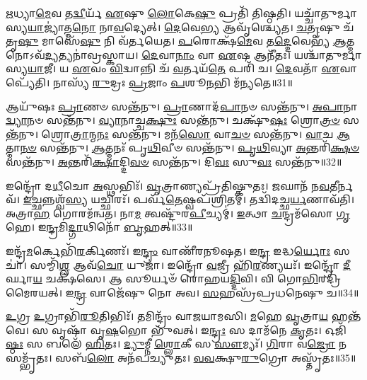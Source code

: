 \-\ul{𑌋}\-𑌧𑍍𑌯𑌾\-\ul{𑌮𑍇}\-𑌵 𑌤\-\ul{𑌦𑍍𑌵𑍀}\-𑌰𑍍𑌯᳴ \ul{𑌏}\-𑌷𑍁 \ul{𑌲𑍋}\-𑌕𑍇\-\ul{𑌷𑍁} 𑌪𑍍𑌰𑌤𑌿᳴ 𑌤𑌿𑌷𑍍𑌠𑌤𑌿।
𑌯𑌚𑍍𑌚𑌾᳴𑌤𑍁𑌰𑍍𑌮𑌾𑌸𑍍𑌯\-\-\ul{𑌯𑌾}\-𑌜𑍍𑌯𑌾॑𑌤𑍍𑌮\-\ul{𑌨𑍋} 𑌨𑌾\-\ul{𑌵}\-𑌦𑍍𑌯𑍇𑌤𑍍।
\-\ul{𑌦𑍇}\-𑌵𑍇\-\ul{𑌭𑍍𑌯} 𑌆𑌵𑍃᳴𑌶𑍍𑌚𑍍𑌯𑍇𑌤।
\-\ul{𑌚}\-\-\ul{𑌤𑍃}\-𑌷𑍁 𑌚᳴𑌤𑍃\-\ul{𑌷𑍁} 𑌮𑌾𑌸𑍇᳴\-\ul{𑌷𑍁} 𑌨𑌿 𑌵᳴𑌰𑍍𑌤𑌯𑍇𑌤।
\-\ul{𑌪}\-𑌰𑍋𑌕𑍍𑌷᳴\-\ul{𑌮𑍇}\-𑌵 𑌤\-\ul{𑌦𑍍𑌦𑍇}\-𑌵𑍇𑌭𑍍𑌯᳴ \ul{𑌆}\-𑌤𑍍𑌮𑌨𑍋\-𑌽𑌵᳴\-\ul{𑌦𑍍𑌯}\-𑌤𑍍𑌯𑌨𑌾॑\-𑌵𑍍𑌰𑌸𑍍𑌕𑌾𑌯।
\-\ul{𑌦𑍇}\-𑌵𑌾\-\ul{𑌨𑌾𑌂} 𑌵𑌾 \ul{𑌏}\-𑌷 𑌆𑌨𑍀᳴𑌤𑌃।
𑌯𑌶𑍍𑌚𑌾᳴𑌤𑍁𑌰𑍍𑌮𑌾𑌸𑍍𑌯\-\ul{𑌯𑌾}\-𑌜𑍀।
𑌯 \ul{𑌏}\-𑌵𑌂 \ul{𑌵𑌿}\-𑌦𑍍𑌵𑌾𑌨𑍍𑌨𑌿 𑌚᳴ \ul{𑌵}\-𑌰𑍍𑌤𑌯᳴\-\ul{𑌤𑍇} 𑌪𑌰𑌿᳴ 𑌚।
\-\ul{𑌦𑍇}\-𑌵𑌤𑌾᳴ \ul{𑌏}\-𑌵𑌾𑌪𑍍𑌯𑍇᳴𑌤𑌿।
𑌨𑌾𑌸𑍍𑌯᳴ \ul{𑌰𑍁}\-𑌦𑍍𑌰𑌃 \ul{𑌪𑍍𑌰}\-𑌜𑌾𑌂 \ul{𑌪}\-𑌶𑍂\-\ul{𑌨}\-𑌭𑌿 𑌮᳴𑌨𑍍𑌯𑌤𑍇॥31॥\anuvakamend[\-\ul{𑌏}\-\-\ul{𑌤𑍍𑌯𑍇}\-\-\ul{𑌤𑍍𑌯}\-\-\ul{𑌯𑍁}\-\-\ul{𑌞𑍍𑌜}\-𑌤𑌾𑌸𑍁᳴𑌰𑌾 𑌏𑌤𑌿 \ul{𑌲𑍋}\-𑌕𑌾 𑌮᳴𑌨𑍍𑌯𑌤𑍇]

𑌆𑌯𑍁᳴𑌷𑌃 \ul{𑌪𑍍𑌰𑌾}\-𑌣𑍞 𑌸𑌨𑍍𑌤᳴𑌨𑍁।
\-\ul{𑌪𑍍𑌰𑌾}\-𑌣𑌾𑌦᳴\-\ul{𑌪𑌾}\-𑌨𑍞 𑌸𑌨𑍍𑌤᳴𑌨𑍁।
\-\ul{𑌅}\-\-\ul{𑌪𑌾}\-𑌨𑌾\-\ul{𑌦𑍍𑌵𑍍𑌯𑌾}\-𑌨𑍞 𑌸𑌨𑍍𑌤᳴𑌨𑍁।
\-\ul{𑌵𑍍𑌯𑌾}\-𑌨𑌾𑌚𑍍𑌚\-\ul{𑌕𑍍𑌷𑍁𑌃} 𑌸𑌨𑍍𑌤᳴𑌨𑍁।
𑌚𑌕𑍍𑌷𑍁᳴\-\ul{𑌷𑌃} 𑌶𑍍𑌰𑍋\-\ul{𑌤𑍍𑌰}\-\-\ul{𑍞} 𑌸𑌨𑍍𑌤᳴𑌨𑍁।
𑌶𑍍𑌰𑍋\-\ul{𑌤𑍍𑌰𑌾}\-𑌨𑍍𑌮\-\ul{𑌨𑌃} 𑌸𑌨𑍍𑌤᳴𑌨𑍁।
𑌮𑌨᳴\-\ul{𑌸𑍋} 𑌵𑌾\-\ul{𑌚}\-\-\ul{𑍞} 𑌸𑌨𑍍𑌤᳴𑌨𑍁।
\-\ul{𑌵𑌾}\-𑌚 \ul{𑌆}\-𑌤𑍍𑌮𑌾\-\ul{𑌨}\-\-\ul{𑍞} 𑌸𑌨𑍍𑌤᳴𑌨𑍁।
\-\ul{𑌆}\-𑌤𑍍𑌮𑌨𑌃᳴ 𑌪𑍃\-\ul{𑌥𑌿}\-𑌵𑍀𑍞 𑌸𑌨𑍍𑌤᳴𑌨𑍁।
\-\ul{𑌪𑍃}\-\-\ul{𑌥𑌿}\-𑌵𑍍𑌯𑌾 \ul{𑌅}\-𑌨𑍍𑌤𑌰𑌿᳴\-\ul{𑌕𑍍𑌷}\-\-\ul{𑍞} 𑌸𑌨𑍍𑌤᳴𑌨𑍁।
\-\ul{𑌅}\-𑌨𑍍𑌤𑌰𑌿᳴\-\ul{𑌕𑍍𑌷𑌾}\-𑌦𑍍𑌦𑌿\-\ul{𑌵}\-\-\ul{𑍞} 𑌸𑌨𑍍𑌤᳴𑌨𑍁।
𑌦𑌿\-\ul{𑌵𑌃} 𑌸𑍁\-\ul{𑌵𑌃} 𑌸𑌨𑍍𑌤᳴𑌨𑍁॥32॥\anuvakamend[\-\ul{𑌅}\-𑌨𑍍𑌤𑌰𑌿᳴\-\ul{𑌕𑍍𑌷}\-\-\ul{𑍞} 𑌸𑌨𑍍𑌤᳴\-\ul{𑌨𑍁} 𑌦𑍍𑌵𑍇 𑌚᳴]

𑌇𑌨𑍍𑌦𑍍𑌰𑍋᳴ 𑌦\-\ul{𑌧𑍀}\-𑌚𑍋 \ul{𑌅}\-𑌸𑍍𑌥𑌭𑌿𑌃᳴।
\-\ul{𑌵𑍃}\-𑌤𑍍𑌰𑌾𑌣𑍍𑌯𑌪𑍍𑌰᳴𑌤𑌿𑌷𑍍𑌕𑍁𑌤𑌃।
\-\ul{𑌜}\-𑌘𑌾𑌨᳴ 𑌨\-\ul{𑌵}\-𑌤𑍀𑌰𑍍𑌨𑌵᳴।
\-\ul{𑌇}\-𑌚𑍍𑌛𑌨𑍍𑌨𑌶𑍍𑌵᳴\-\ul{𑌸𑍍𑌯} 𑌯𑌚𑍍𑌛𑌿𑌰𑌃᳴।
𑌪𑌰𑍍𑌵᳴\-\ul{𑌤𑍇}\-𑌷𑍍𑌵𑌪᳴𑌶𑍍𑌰𑌿𑌤𑌮𑍍।
𑌤𑌦𑍍𑌵𑌿᳴𑌦𑌚𑍍𑌛\-\ul{𑌰𑍍𑌯}\-𑌣𑌾𑌵᳴𑌤𑌿।
𑌅𑌤𑍍𑌰𑌾\-\ul{𑌹} 𑌗𑍋𑌰𑌮᳴𑌨𑍍𑌵𑌤।
𑌨𑌾\-\ul{𑌮} 𑌤𑍍𑌵𑌷𑍍𑌟𑍁᳴𑌰\-\ul{𑌪𑍀}\-𑌚𑍍𑌯𑌮𑍍॑।
\-\ul{𑌇}\-𑌤𑍍𑌥𑌾 \ul{𑌚}\-𑌨𑍍𑌦𑍍𑌰𑌮᳴𑌸𑍋 \ul{𑌗𑍃}\-𑌹𑍇।
𑌇\-\ul{𑌨𑍍𑌦𑍍𑌰}\-𑌮𑌿\-\ul{𑌦𑍍𑌗𑌾}\-𑌥𑌿𑌨𑍋᳴ \ul{𑌬𑍃}\-𑌹𑌤𑍍॥33॥

𑌇𑌨𑍍𑌦𑍍𑌰᳴\-\ul{𑌮}\-𑌰𑍍𑌕𑍇𑌭𑌿᳴\-\ul{𑌰}\-𑌰𑍍𑌕𑌿𑌣𑌃᳴।
𑌇\-\ul{𑌨𑍍𑌦𑍍𑌰𑌂} 𑌵𑌾𑌣𑍀᳴𑌰𑌨𑍂𑌷𑌤।
𑌇\-\ul{𑌨𑍍𑌦𑍍𑌰} 𑌇𑌦𑍍𑌧\-\ul{𑌰𑍍𑌯𑍋𑌃} 𑌸𑌚𑌾॑।
𑌸𑌮𑍍𑌮𑌿᳴\-\ul{𑌶𑍍𑌲} 𑌆𑌵᳴\-\ul{𑌚𑍋} 𑌯𑍁𑌜𑌾॑।
𑌇𑌨𑍍𑌦𑍍𑌰𑍋᳴ \ul{𑌵}\-𑌜𑍍𑌰𑍀 𑌹𑌿᳴\-\ul{𑌰}\-𑌣𑍍𑌯𑌯𑌃᳴।
𑌇𑌨𑍍𑌦𑍍𑌰𑍋᳴ \ul{𑌦𑍀}\-𑌰𑍍𑌘𑌾\-\ul{𑌯} 𑌚𑌕𑍍𑌷᳴𑌸𑍇।
𑌆 𑌸𑍂𑌰𑍍𑌯𑍞᳴ 𑌰𑍋𑌹𑌯\-\ul{𑌦𑍍𑌦𑌿}\-𑌵𑌿।
𑌵𑌿 𑌗𑍋\-\ul{𑌭𑌿}\-𑌰𑌦𑍍𑌰𑌿᳴𑌮𑍈𑌰𑌯𑌤𑍍।
𑌇\-\ul{𑌨𑍍𑌦𑍍𑌰} 𑌵𑌾𑌜𑍇᳴𑌷𑍁 𑌨𑍋 𑌅𑌵।
\-\ul{𑌸}\-𑌹𑌸𑍍𑌰᳴𑌪𑍍𑌰𑌧𑌨𑍇𑌷𑍁 𑌚॥34॥

\-\ul{𑌉}\-𑌗𑍍𑌰 \ul{𑌉}\-𑌗𑍍𑌰𑌾𑌭𑌿᳴\-\ul{𑌰𑍂}\-𑌤𑌿𑌭𑌿𑌃᳴।
𑌤𑌮𑌿𑌨𑍍𑌦𑍍𑌰𑌂᳴ 𑌵𑌾𑌜𑌯𑌾𑌮𑌸𑌿।
\-\ul{𑌮}\-𑌹𑍇 \ul{𑌵𑍃}\-𑌤𑍍𑌰𑌾\-\ul{𑌯} 𑌹𑌨𑍍𑌤᳴𑌵𑍇।
𑌸 𑌵𑍃𑌷𑌾᳴ 𑌵𑍃\-\ul{𑌷}\-𑌭𑍋 𑌭𑍁᳴𑌵𑌤𑍍।
𑌇\-\ul{𑌨𑍍𑌦𑍍𑌰𑌃} 𑌸 𑌦𑌾𑌮᳴𑌨𑍇 \ul{𑌕𑍃}\-𑌤𑌃।
𑌓𑌜𑌿᳴\-\ul{𑌷𑍍𑌠𑌃} 𑌸 𑌬𑌲𑍇᳴ \ul{𑌹𑌿}\-𑌤𑌃।
\-\ul{𑌦𑍍𑌯𑍁}\-𑌮𑍍𑌨𑍀 \ul{𑌶𑍍𑌲𑍋}\-𑌕𑍀 𑌸 \ul{𑌸𑍗}\-𑌮𑍍𑌯𑌃᳴।
\-\ul{𑌗𑌿}\-𑌰𑌾 𑌵\-\ul{𑌜𑍍𑌰𑍋} 𑌨 𑌸𑌮𑍍𑌭𑍃᳴𑌤𑌃।
𑌸𑌬᳴\-\ul{𑌲𑍋} 𑌅𑌨᳴𑌪𑌚𑍍𑌯𑍁𑌤𑌃।
\-\ul{𑌵}\-\-\ul{𑌵}\-𑌕𑍍𑌷𑍁\-\ul{𑌰𑍁}\-𑌗𑍍𑌰𑍋 𑌅𑌸𑍍𑌤𑍃᳴𑌤𑌃॥35॥\anuvakamend[\-\ul{𑌬𑍃}\-𑌹𑌚𑍍𑌚𑌾𑌸𑍍𑌤𑍃᳴𑌤𑌃]


